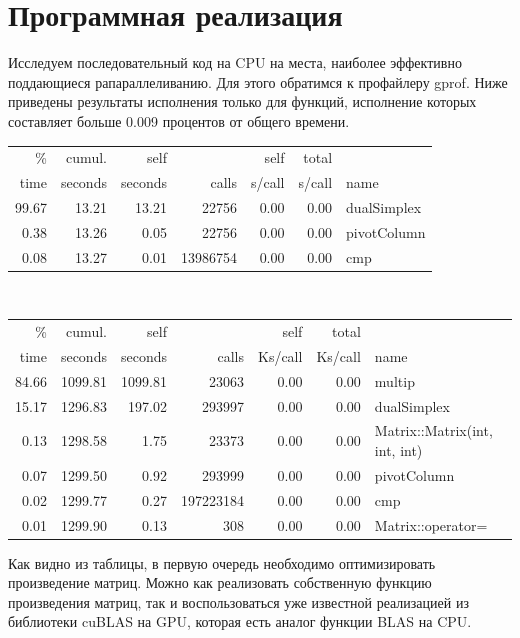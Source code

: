 \documentclass[a4paper,14pt,russian]{extreport}
\begin{document}
\section{Программная реализация}

Исследуем последовательный код на CPU на места, наиболее эффективно поддающиеся рапараллеливанию. Для этого обратимся к профайлеру gprof. Ниже приведены результаты исполнения только для функций, исполнение которых составляет больше 0.009 процентов от общего времени.
\\
\begin{tabular}{rrrrrrp{3cm}}
  \% &  cumul. &  self    & &         self  &   total    \\       
 time  & seconds &  seconds  &  calls &  s/call &  s/call & name    \\
 99.67  &   13.21  &  13.21 &   22756 &    0.00 &    0.00 & dualSimplex\\
  0.38  &   13.26  &   0.05  &  22756 &    0.00  &   0.00 & pivotColumn\\
  0.08   &  13.27 &    0.01 & 13986754 &    0.00 &    0.00 &  cmp\\
\end{tabular}
\\
\begin{tabular}{rrrrrrp{3cm}}
  \% &  cumul. &  self  &          &  self  &   total    & \\       
 time  & seconds  & seconds  &  calls & Ks/call & Ks/call &  name  \\  
 84.66 &  1099.81 & 1099.81 &   23063 &    0.00  &   0.00 & multip\\
 15.17 &  1296.83 &  197.02  & 293997  &   0.00  &   0.00 & dualSimplex\\
  0.13 &  1298.58  &   1.75  &  23373  &   0.00  &   0.00 & Matrix::Matrix(int, int, int)\\
  0.07 &  1299.50  &   0.92 &  293999  &   0.00  &   0.00 & pivotColumn\\
  0.02 &  1299.77  &   0.27 & 197223184  &   0.00 &    0.00 & cmp\\
  0.01 &  1299.90  &   0.13  &    308   &  0.00  &   0.00 & Matrix::operator=\\
\end{tabular}
\par Как видно из таблицы, в первую очередь необходимо оптимизировать произведение матриц. Можно как реализовать собственную функцию произведения матриц, так и воспользоваться уже известной реализацией из библиотеки cuBLAS на GPU, которая есть аналог функции BLAS на CPU. 
\end{document}
